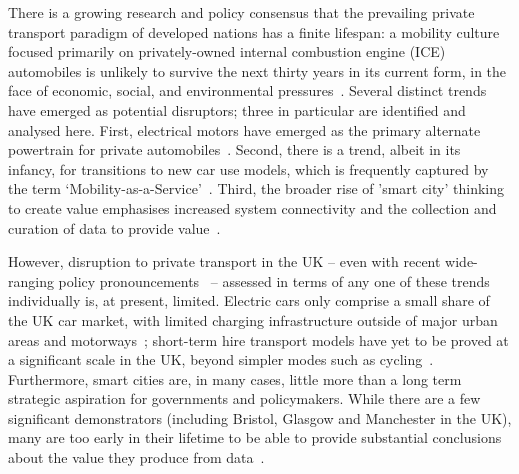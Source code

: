 \documentclass[b5paper,10pt]{article}
\begin{document}
There is a growing research and policy consensus that the prevailing
private transport paradigm of developed nations has a finite lifespan:
a mobility culture focused primarily on privately-owned internal
combustion engine (ICE) automobiles is unlikely to survive the next
thirty years in its current form, in the face of economic, social, and
environmental
pressures~\citep{lerner:2011,van-audenhove-et-al:2014,black-et-al:2016}.
Several distinct trends have emerged as potential disruptors; three in
particular are identified and analysed here. First, electrical motors
have emerged as the primary alternate powertrain for private
automobiles~\citep{paffumi-et-al:2015,gnann-et-al:2015}.  Second,
there is a trend, albeit in its infancy, for transitions to new car
use models, which is frequently captured by the term
`Mobility-as-a-Service'~\citep{tscatapult:2016}. Third, the broader
rise of 'smart city' thinking to create value emphasises increased
system connectivity and the collection and curation of data to provide
value~\citep{townsend:2013,cosgrave-et-al:2013,ibm:2014}.

However, disruption to private transport in the UK -- even with recent
wide-ranging policy pronouncements~\citep{bbcnews:2017} -- assessed in
terms of any one of these trends individually is, at present,
limited. Electric cars only comprise a small share of the UK car
market, with limited charging infrastructure outside of major urban
areas and motorways~\citep{brook:2015}; short-term hire transport
models have yet to be proved at a significant scale in the UK, beyond
simpler modes such as
cycling~\citep{kamargianni-et-al:2016}. Furthermore, smart cities are,
in many cases, little more than a long term strategic aspiration for
governments and policymakers. While there are a few significant
demonstrators (including Bristol, Glasgow and Manchester in the UK),
many are too early in their lifetime to be able to provide substantial
conclusions about the value they produce from
data~\citep{ojo-et-al:2015,sta:2017}.
\end{document}
